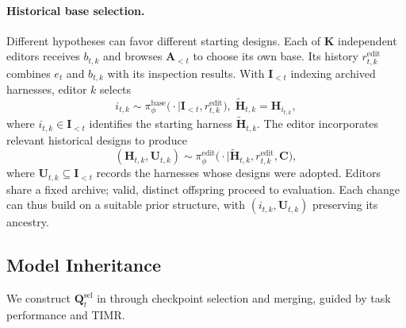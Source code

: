 \documentclass[11pt,a4paper]{article}
\begin{document}
\paragraph{Historical base selection.}
Different hypotheses can favor different starting designs. Each of $\mathbf{K}$ independent editors receives $b_{t,k}$ and browses $\mathbf{A}_{<t}$ to choose its own base. Its history $r_{t,k}^{\mathrm{edit}}$ combines $e_t$ and $b_{t,k}$ with its inspection results. With $\mathbf{I}_{<t}$ indexing archived harnesses, editor $k$ selects
\begin{equation}
i_{t,k}\sim\pi_\phi^{\mathrm{base}}\bigl(\cdot\mid\mathbf{I}_{<t},r_{t,k}^{\mathrm{edit}}\bigr),
\;\widetilde{\mathbf{H}}_{t,k}=\mathbf{H}_{i_{t,k}},
\label{eq:lineage-base}
\end{equation}
where $i_{t,k}\in\mathbf{I}_{<t}$ identifies the starting harness $\widetilde{\mathbf{H}}_{t,k}$. The editor incorporates relevant historical designs to produce
\begin{equation}
(\mathbf{H}_{t,k},\mathbf{U}_{t,k})\sim\pi_\phi^{\mathrm{edit}}\bigl(\cdot\mid\widetilde{\mathbf{H}}_{t,k},r_{t,k}^{\mathrm{edit}},\mathbf{C}\bigr),
\label{eq:lineage-edit}
\end{equation}
where $\mathbf{U}_{t,k}\subseteq\mathbf{I}_{<t}$ records the harnesses whose designs were adopted. Editors share a fixed archive; valid, distinct offspring proceed to evaluation. Each change can thus build on a suitable prior structure, with $(i_{t,k},\mathbf{U}_{t,k})$ preserving its ancestry.

\subsection{Model Inheritance}
\label{sec:model-inheritance-adaptation}
We construct $\mathbf{Q}_t^{\mathrm{sel}}$ in  through checkpoint selection and merging, guided by task performance and TIMR.
\end{document}
